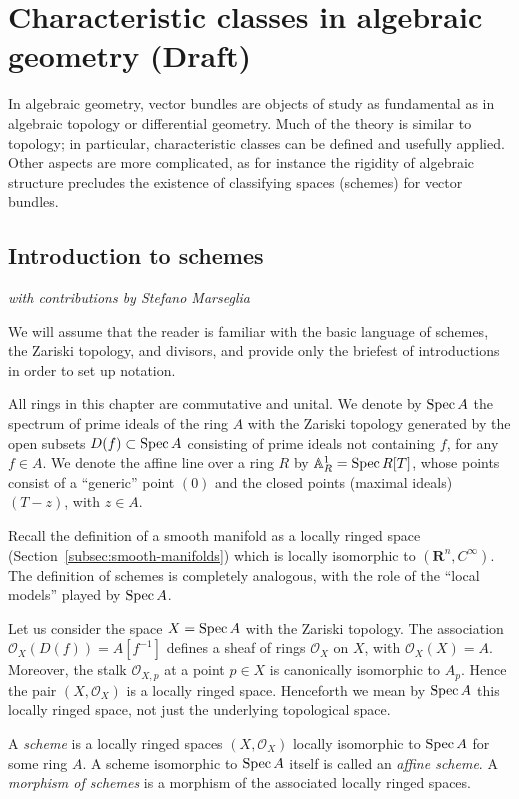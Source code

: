 \documentclass[a4paper,openany]{scrbook}
\newcommand{\Reg}[1]{\mathcal O_{#1}}
\newcommand{\chapterauthor}[1]{\hfill\emph{#1}\par\noindent}
\begin{document}
\chapter{Characteristic classes in algebraic geometry (Draft)}

In algebraic geometry, vector bundles are objects of study as fundamental as in algebraic topology or differential geometry. Much of the theory is similar to topology; in particular, characteristic classes can be defined and usefully applied. Other aspects are more complicated, as for instance the rigidity of algebraic structure precludes the existence of classifying spaces (schemes) for vector bundles.

\section{Introduction to schemes}
\chapterauthor{with contributions by Stefano Marseglia}

We will assume that the reader is familiar with the basic language of schemes, the Zariski topology, and divisors, and provide only the briefest of introductions in order to set up notation.

All rings in this chapter are commutative and unital. We denote by $\operatorname{Spec} A$ the spectrum of prime ideals of the ring $A$ with the Zariski topology generated by the open subsets $D(f) \subset \operatorname{Spec} A$ consisting of prime ideals not containing $f$, for any $f \in  A$. We denote the affine line over a ring $R$ by $\mathbb A^1_R = \operatorname{Spec} R[T]$, whose points consist of a ``generic'' point $(0)$ and the closed points (maximal ideals) $(T-z)$, with $z\in A$.

Recall the definition of a smooth manifold as a locally ringed space (Section~\ref{subsec:smooth-manifolds}) which is locally isomorphic to $(\mathbf R^n,C^\infty)$. The definition of schemes is completely analogous, with the role of the ``local models'' played by $\operatorname{Spec} A$.

Let us consider the space $X = \operatorname{Spec} A$ with the Zariski topology. The association $\Reg{X}(D(f))=A[f^{-1}]$ defines a sheaf of rings $\Reg{X}$ on $X$, with $\Reg{X}(X)=A$. Moreover, the stalk $\mathcal O_{X,p}$ at a point $p\in X$ is canonically isomorphic to $A_p$. Hence the pair $(X,\Reg{X})$ is a locally ringed space. Henceforth we mean by $\operatorname{Spec} A$ this locally ringed space, not just the underlying topological space.

\begin{defn}
A \emph{scheme} is a locally ringed spaces $(X,\Reg{X})$ locally isomorphic to $\operatorname{Spec} A$ for some ring $A$. A scheme isomorphic to $\operatorname{Spec} A$ itself is called an \emph{affine scheme}. A \emph{morphism of schemes} is a morphism of the associated locally ringed spaces.
\end{defn}
\end{document}
